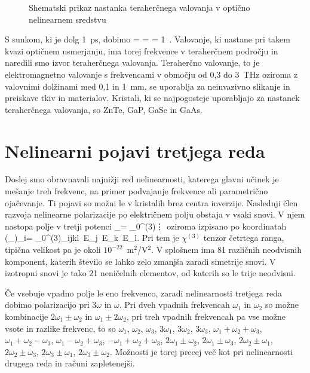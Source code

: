 \begin{figure}[h]
\centering
\def\svgwidth{90truemm} 

\caption{Shematski prikaz nastanka teraherčnega valovanja v optično nelinearnem sredstvu}
\label{fig:THz}
\end{figure}

S sunkom, ki je dolg 1~ps, dobimo
\beq
\Delta \omega =  =  = 1~.
\eeq
Valovanje, ki nastane pri takem kvazi optičnem usmerjanju, ima torej frekvence v teraherčnem
področju in naredili smo izvor teraherčnega valovanja. Teraherčno valovanje, to je 
elektromagnetno valovanje s frekvencami v območju od 0,3 do 3~THz oziroma z valovnimi dolžinami 
med 0,1 in 1~mm, se uporablja za neinvazivno slikanje in preiskave tkiv in materialov. Kristali, ki 
se najpogosteje uporabljajo za nastanek teraherčnega valovanja, so ZnTe, GaP, GaSe in GaAs.

\section{Nelinearni pojavi tretjega reda}

Doslej smo obravnavali najnižji red nelinearnosti, katerega glavni
učinek je mešanje treh frekvenc, na primer podvajanje frekvence ali
parametrično ojačevanje. Ti pojavi so možni le v kristalih brez centra
inverzije. Naslednji člen razvoja nelinearne polarizacije po električnem
polju obstaja v vsaki snovi. V njem nastopa polje v tretji potenci
\beq
{}_{}= \epsilon_{0}\chi^{(3)}\vdots \mathbin 
{}\mathbin {}\mathbin{}
\eeq
oziroma izpisano po koordinatah
\beq
\left(_{}\right)_i= \epsilon_{0}\chi^{(3)}_{ijkl} \,E_j \,E_k\, E_l.
\eeq
Pri tem je $\chi^{(3)}$ tenzor četrtega ranga, tipična velikost pa je okoli 
$10^{-22}$~m$^2$/V$^2$. V splošnem ima 81 različnih neodvisnih komponent, katerih
število se lahko zelo zmanjša zaradi simetrije snovi. V izotropni snovi je tako 
21 neničelnih elementov, od katerih so le trije neodvisni. 

Če vsebuje vpadno polje le eno frekvenco, zaradi nelinearnosti tretjega
reda dobimo polarizacijo pri 3$\omega$ in $\omega$. Pri dveh vpadnih
frekvencah $\omega_{1}$ in $\omega_{2}$ so možne kombinacije $2\omega_{1}\pm\omega_{2}$
in $\omega_{1}\pm2\omega_{2}$, pri treh vpadnih frekvencah pa vse
možne vsote in razlike frekvenc, to so $\omega_1$, $\omega_2$, $\omega_3$, 
$3\omega_1$, $3 \omega_2$, $3\omega_3$, 
$\omega_1 + \omega_2 + \omega_3$, $\omega_1 + \omega_2 - \omega_3$, 
$\omega_1 - \omega_2 + \omega_3$, $- \omega_1 + \omega_2 + \omega_3$, 
$2 \omega_1\pm\omega_2$, $2 \omega_1\pm\omega_3$, $2 \omega_2\pm\omega_1$,
$2 \omega_2\pm\omega_3$, $2 \omega_3\pm\omega_1$, $2 \omega_3\pm\omega_2$.
Možnosti je torej precej več kot pri nelinearnosti drugega reda in računi zapletenejši.

